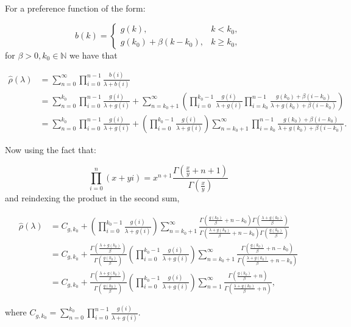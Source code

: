 \documentclass[
  sn-basic,
  10pt,
]{sn-jnl}
\theoremstyle{plain}
\theoremstyle{plain}
\theoremstyle{remark}
\begin{document}
For a preference function of the form:

\[
b(k) = \begin{cases}
g(k),&k<k_0,\\
g(k_0) + \beta(k-k_0), &k\ge k_0,
\end{cases}
\] for \(\beta>0, k_0\in\mathbb N\) we have that

\begin{align*}
\hat\rho(\lambda) &= \sum_{n=0}^\infty\prod_{i=0}^{n-1}\frac{b(i)}{\lambda+b(i)}\\ &= \sum_{n=0}^{k_0}\prod_{i=0}^{n-1}\frac{g(i)}{\lambda+g(i)} + \sum_{n=k_0+1}^\infty\left(\prod_{i=0}^{k_0-1}\frac{g(i)}{\lambda+g(i)}\prod_{i=k_0}^{n-1}\frac{g(k_0) + \beta(i-k_0)}{\lambda +g(k_0) + \beta(i-k_0)}\right)\\
&=\sum_{n=0}^{k_0}\prod_{i=0}^{n-1}\frac{g(i)}{\lambda+g(i)} + \left(\prod_{i=0}^{k_0-1}\frac{g(i)}{\lambda+g(i)}\right)\sum_{n=k_0+1}^\infty\prod_{i=k_0}^{n-1}\frac{g(k_0) + \beta(i-k_0)}{\lambda +g(k_0) + \beta(i-k_0)}.
\end{align*}

Now using the fact that:

\[
\prod_{i=0}^n(x+yi) = x^{n+1}\frac{\Gamma\left(\frac{x}{y}+n+1\right)}{\Gamma\left(\frac{x}{y}\right)}
\] and reindexing the product in the second sum,

\begin{align*}
\hat\rho(\lambda) &= C_{g,k_0} + \left(\prod_{i=0}^{k_0-1}\frac{g(i)}{\lambda+g(i)}\right)\sum_{n=k_0+1}^\infty\frac{\Gamma\left(\frac{g(k_0)}{\beta}+n-k_0\right)\Gamma\left(\frac{\lambda+g(k_0)}{\beta}\right)}{\Gamma\left(\frac{\lambda+g(k_0)}{\beta}+n-k_0\right)\Gamma\left(\frac{g(k_0)}{\beta}\right)}\\
&= C_{g,k_0} + \frac{\Gamma\left(\frac{\lambda+g(k_0)}{\beta}\right)}{\Gamma\left(\frac{g(k_0)}{\beta}\right)}\left(\prod_{i=0}^{k_0-1}\frac{g(i)}{\lambda+g(i)}\right)\sum_{n=k_0+1}^\infty\frac{\Gamma\left(\frac{g(k_0)}{\beta}+n-k_0\right)}{\Gamma\left(\frac{\lambda+g(k_0)}{\beta}+n-k_0\right)}\\
&=C_{g,k_0} + \frac{\Gamma\left(\frac{\lambda+g(k_0)}{\beta}\right)}{\Gamma\left(\frac{g(k_0)}{\beta}\right)}\left(\prod_{i=0}^{k_0-1}\frac{g(i)}{\lambda+g(i)}\right)\sum_{n=1}^\infty\frac{\Gamma\left(\frac{g(k_0)}{\beta}+n\right)}{\Gamma\left(\frac{\lambda+g(k_0)}{\beta}+n\right)},
\end{align*}

where
\(C_{g,k_0} = \sum_{n=0}^{k_0}\prod_{i=0}^{n-1}\frac{g(i)}{\lambda+g(i)}\).
\end{document}
